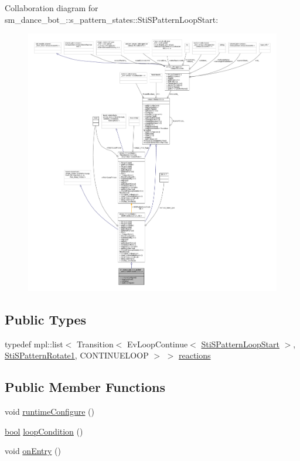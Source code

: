 Collaboration diagram for sm\+\_\+dance\+\_\+bot\+\_\+:\+:s\+\_\+pattern\+\_\+states\+:\+:Sti\+S\+Pattern\+Loop\+Start\+:
\nopagebreak
\begin{figure}[H]
\begin{center}
\leavevmode
\includegraphics[width=350pt]{structsm__dance__bot__3_1_1s__pattern__states_1_1StiSPatternLoopStart__coll__graph}
\end{center}
\end{figure}
\subsection*{Public Types}
\begin{DoxyCompactItemize}
\item 
typedef mpl\+::list$<$ Transition$<$ Ev\+Loop\+Continue$<$ \hyperlink{structsm__dance__bot__3_1_1s__pattern__states_1_1StiSPatternLoopStart}{Sti\+S\+Pattern\+Loop\+Start} $>$, \hyperlink{structsm__dance__bot__3_1_1s__pattern__states_1_1StiSPatternRotate1}{Sti\+S\+Pattern\+Rotate1}, C\+O\+N\+T\+I\+N\+U\+E\+L\+O\+OP $>$ $>$ \hyperlink{structsm__dance__bot__3_1_1s__pattern__states_1_1StiSPatternLoopStart_a0ccc66b55fb73dc045bff761f63388fa}{reactions}
\end{DoxyCompactItemize}
\subsection*{Public Member Functions}
\begin{DoxyCompactItemize}
\item 
void \hyperlink{structsm__dance__bot__3_1_1s__pattern__states_1_1StiSPatternLoopStart_a4d3fe1964019d0fb65b33dccde8439c0}{runtime\+Configure} ()
\item 
\hyperlink{classbool}{bool} \hyperlink{structsm__dance__bot__3_1_1s__pattern__states_1_1StiSPatternLoopStart_ab12649ababdedbdc0665df5a0ce8b076}{loop\+Condition} ()
\item 
void \hyperlink{structsm__dance__bot__3_1_1s__pattern__states_1_1StiSPatternLoopStart_ad63c7bf4033d38b80d280730e217e5d7}{on\+Entry} ()
\end{DoxyCompactItemize}
